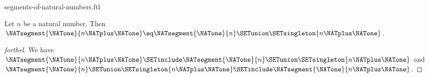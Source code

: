 \documentclass{naproche-library}
\begin{document}
\begin{smodule}[title=Segments of the Natural Numbers]{segments-of-natural-numbers.ftl}
\begin{proposition}[forthel,id=FOUNDATIONS_14_658708738605056]
  Let $n$ be a natural number.
  Then $\NATsegment{\NATone}{n \NATplus \NATone} \eq \NATsegment{\NATone}{n} \SETunion \SETsingleton{n \NATplus \NATone}$.
\end{proposition}
\begin{proof}[forthel]
  We have
  $\NATsegment{\NATone}{n \NATplus \NATone} \SETinclude \NATsegment{\NATone}{n} \SETunion \SETsingleton{n \NATplus \NATone}$ and $\NATsegment{\NATone}{n} \SETunion \SETsingleton{n \NATplus \NATone} \SETinclude \NATsegment{\NATone}{n \NATplus \NATone}$.
\end{proof}
\end{smodule}
\end{document}
